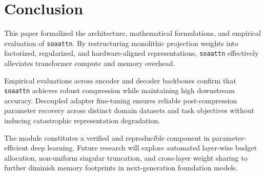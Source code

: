 \section{Conclusion}
This paper formalized the architecture, mathematical formulations, and empirical evaluation of \texttt{soaattn}. By restructuring monolithic projection weights into factorized, regularized, and hardware-aligned representations, \texttt{soaattn} effectively alleviates transformer compute and memory overhead.

Empirical evaluations across encoder and decoder backbones confirm that \texttt{soaattn} achieves robust compression while maintaining high downstream accuracy. Decoupled adapter fine-tuning ensures reliable post-compression parameter recovery across distinct domain datasets and task objectives without inducing catastrophic representation degradation.

The module constitutes a verified and reproducible component in parameter-efficient deep learning. Future research will explore automated layer-wise budget allocation, non-uniform singular truncation, and cross-layer weight sharing to further diminish memory footprints in next-generation foundation models.
